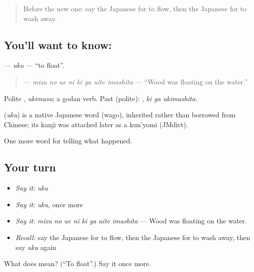 \begin{quote}
Before the new one: say the Japanese for to flow, then the Japanese for to wash away.
\end{quote}

\subsection*{You'll want to know: }
\textbf{} — \emph{uku} — \textquotedblleft{}to float\textquotedblright{}.

\begin{quote}
\textbf{   } — \emph{mizu no ue ni ki ga uite imashita} — \textquotedblleft{}Wood was floating on the water.\textquotedblright{}
\end{quote}

Polite \textbf{}, \emph{ukimasu}; a godan verb. Past (polite): \textbf{ }, \emph{ki ga ukimashita}.

\begin{cousinweb}
\textbf{} (\emph{uku}) is a native Japanese word (wago), inherited rather than borrowed from Chinese; its kanji was attached later as a kun'yomi (JMdict).
\end{cousinweb}

\begin{grammarlens}[title={What you've built}]
One more word for telling what happened.
\end{grammarlens}

\subsection*{Your turn}
\begin{itemize}
\raggedright
  \item \emph{Say it:} \emph{uku}
  \item \emph{Say it:} \emph{uku}, once more
  \item \emph{Say it:} \emph{mizu no ue ni ki ga uite imashita} — Wood was floating on the water.
  \item \emph{Recall:} say the Japanese for to flow, then the Japanese for to wash away, then say \emph{uku} again
\end{itemize}

\begin{tcolorbox}[breakable,colback=teal!4,colframe=teal!35!black,title={Before you move on}]
What does  mean? (\textquotedblleft{}To float\textquotedblright{}.) Say it once more.
\end{tcolorbox}
